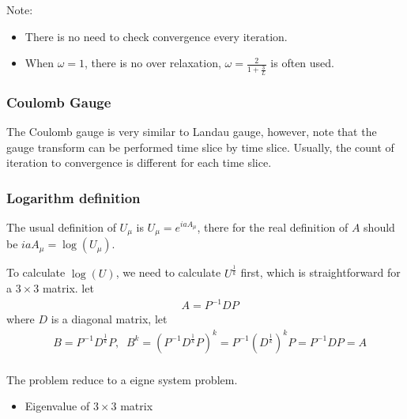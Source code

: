 Note:
\begin{itemize}
  \item There is no need to check convergence every iteration.
  \item When $\omega = 1$, there is no over relaxation, $\omega = \frac{2}{1+\frac{3}{L}}$ is often used.
\end{itemize}

\subsubsection{\label{sec:CoulombGauge}Coulomb Gauge}

The Coulomb gauge is very similar to Landau gauge, however, note that the gauge transform can be performed time slice by time slice. Usually, the count of iteration to convergence is different for each time slice.

\subsubsection{\label{sec:LogarithmDefinition}Logarithm definition}

The usual definition of $U_{\mu}$ is $U_{\mu}=e^{iaA_{\mu}}$, there for the real definition of $A$ should be $iaA_{\mu}=\log (U_{\mu})$.

To calculate $\log (U)$, we need to calculate $U^{\frac{1}{k}}$ first, which is straightforward for a $3\times 3$ matrix. let
\begin{equation}
\begin{split}
&A=P^{-1}DP
\end{split}
\end{equation}
where $D$ is a diagonal matrix, let
\begin{equation}
\begin{split}
&B=P^{-1}D^{\frac{1}{k}}P,\;\;B^k=\left(P^{-1}D^{\frac{1}{k}}P\right)^k=P^{-1}\left(D^{\frac{1}{k}}\right)^k P=P^{-1}DP=A\\
\end{split}
\end{equation}

The problem reduce to a eigne system problem.

\begin{itemize}
  \item Eigenvalue of $3\times 3$ matrix
\end{itemize}

